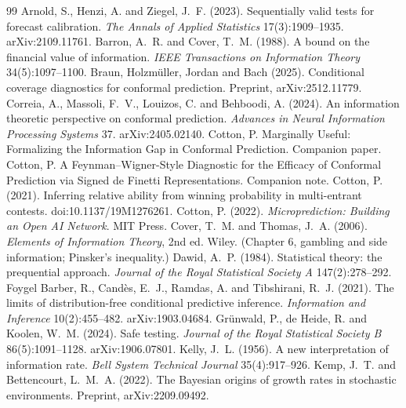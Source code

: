 \documentclass[11pt]{article}
\begin{document}
\begin{thebibliography}{99}
 Arnold, S., Henzi, A. and Ziegel, J.~F. (2023).
Sequentially valid tests for forecast calibration. \emph{The Annals of Applied Statistics}
17(3):1909--1935. arXiv:2109.11761.
 Barron, A.~R. and Cover, T.~M. (1988). A bound on
the financial value of information. \emph{IEEE Transactions on Information Theory} 34(5):1097--1100.
 Braun, Holzm\"uller, Jordan and Bach (2025). Conditional
coverage diagnostics for conformal prediction. Preprint, arXiv:2512.11779.
 Correia, A., Massoli, F.~V., Louizos, C. and Behboodi,
A. (2024). An information theoretic perspective on conformal prediction. \emph{Advances in Neural
Information Processing Systems} 37. arXiv:2405.02140.
 Cotton, P. Marginally Useful: Formalizing the Information Gap
in Conformal Prediction. Companion paper.
 Cotton, P. A Feynman--Wigner-Style Diagnostic for the Efficacy of
Conformal Prediction via Signed de Finetti Representations. Companion note.
 Cotton, P. (2021). Inferring relative ability from winning
probability in multi-entrant contests. doi:10.1137/19M1276261.
 Cotton, P. (2022). \emph{Microprediction: Building an Open
AI Network}. MIT Press.
 Cover, T.~M. and Thomas, J.~A. (2006). \emph{Elements of
Information Theory}, 2nd ed. Wiley. (Chapter 6, gambling and side information; Pinsker's
inequality.)
 Dawid, A.~P. (1984). Statistical theory: the prequential approach.
\emph{Journal of the Royal Statistical Society A} 147(2):278--292.
 Foygel Barber, R., Cand\`es, E.~J., Ramdas,
A. and Tibshirani, R.~J. (2021). The limits of distribution-free conditional predictive inference.
\emph{Information and Inference} 10(2):455--482. arXiv:1903.04684.
 Gr\"unwald, P., de Heide, R. and Koolen, W.~M.
(2024). Safe testing. \emph{Journal of the Royal Statistical Society B} 86(5):1091--1128.
arXiv:1906.07801.
 Kelly, J.~L. (1956). A new interpretation of information rate.
\emph{Bell System Technical Journal} 35(4):917--926.
 Kemp, J.~T. and Bettencourt, L.~M.~A. (2022). The
Bayesian origins of growth rates in stochastic environments. Preprint, arXiv:2209.09492.

\end{thebibliography}
\end{document}
